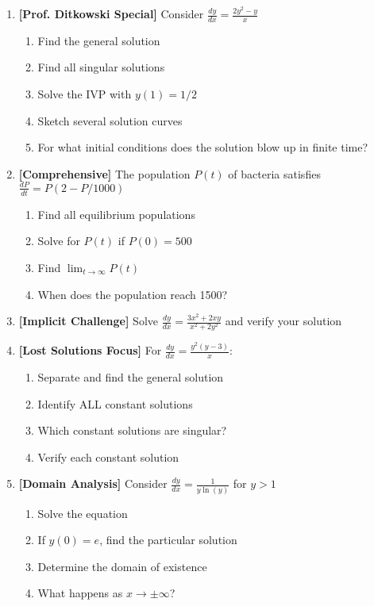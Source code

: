 \documentclass[12pt]{article}
\begin{document}
\begin{enumerate}[resume]
\item \textbf{[Prof. Ditkowski Special]} Consider $\frac{dy}{dx} = \frac{2y^2 - y}{x}$
    \begin{enumerate}
        \item Find the general solution
        \item Find all singular solutions
        \item Solve the IVP with $y(1) = 1/2$
        \item Sketch several solution curves
        \item For what initial conditions does the solution blow up in finite time?
    \end{enumerate}

\item \textbf{[Comprehensive]} The population $P(t)$ of bacteria satisfies $\frac{dP}{dt} = P(2 - P/1000)$
    \begin{enumerate}
        \item Find all equilibrium populations
        \item Solve for $P(t)$ if $P(0) = 500$
        \item Find $\lim_{t \to \infty} P(t)$
        \item When does the population reach 1500?
    \end{enumerate}

\item \textbf{[Implicit Challenge]} Solve $\frac{dy}{dx} = \frac{3x^2 + 2xy}{x^2 + 2y^2}$ and verify your solution

\item \textbf{[Lost Solutions Focus]} For $\frac{dy}{dx} = \frac{y^2(y-3)}{x}$:
    \begin{enumerate}
        \item Separate and find the general solution
        \item Identify ALL constant solutions
        \item Which constant solutions are singular?
        \item Verify each constant solution
    \end{enumerate}

\item \textbf{[Domain Analysis]} Consider $\frac{dy}{dx} = \frac{1}{y\ln(y)}$ for $y > 1$
    \begin{enumerate}
        \item Solve the equation
        \item If $y(0) = e$, find the particular solution
        \item Determine the domain of existence
        \item What happens as $x \to \pm\infty$?
    \end{enumerate}


\end{enumerate}
\end{document}
